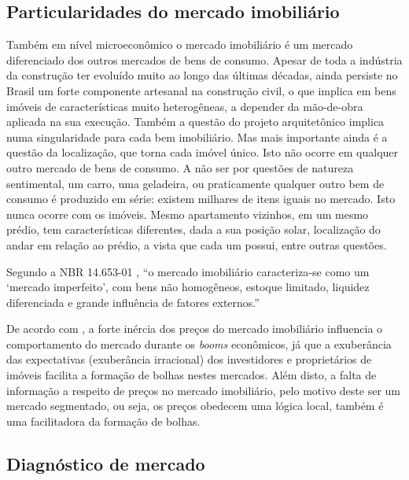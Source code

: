 \documentclass[
	12pt,				%
	oneside,			%
	a4paper,			%
	chapter=TITLE,		%
	section=TITLE,		%
	english,			%
	brazil				%
	]{abntex2}
\begin{document}
\hypertarget{particularidades-do-mercado-imobiliuxe1rio}{%
\subsection{Particularidades do mercado imobiliário}\label{particularidades-do-mercado-imobiliuxe1rio}}

Também em nível microeconômico o mercado imobiliário é um mercado diferenciado
dos outros mercados de bens de consumo. Apesar de toda a indústria da construção
ter evoluído muito ao longo das últimas décadas, ainda persiste no Brasil um
forte componente artesanal na construção civil, o que implica em bens imóveis
de características muito heterogêneas, a depender da mão-de-obra aplicada na sua
execução. Também a questão do projeto arquitetônico implica numa singularidade
para cada bem imobiliário. Mas mais importante ainda é a questão da localização,
que torna cada imóvel único. Isto não ocorre em qualquer outro mercado de bens
de consumo. A não ser por questões de natureza sentimental, um carro, uma
geladeira, ou praticamente qualquer outro bem de consumo é produzido em série:
existem milhares de itens iguais no mercado. Isto nunca ocorre com os imóveis.
Mesmo apartamento vizinhos, em um mesmo prédio, tem características diferentes,
dada a sua posição solar, localização do andar em relação ao prédio, a vista
que cada um possui, entre outras questões.

Segundo a NBR 14.653-01 \autocite*[x]{NBR1465301}, ``o mercado imobiliário caracteriza-se
como um `mercado imperfeito', com bens não homogêneos, estoque limitado,
liquidez diferenciada e grande influência de fatores externos.''

De acordo com \textcite[p.~3]{ADAMS2010}, a forte inércia dos preços do mercado
imobiliário influencia o comportamento do mercado durante os \emph{booms} econômicos,
já que a exuberância das expectativas (exuberância irracional) dos investidores
e proprietários de imóveis facilita a formação de bolhas nestes mercados. Além
disto, a falta de informação a respeito de preços no mercado imobiliário, pelo
motivo deste ser um mercado segmentado, ou seja, os preços obedecem uma lógica
local, também é uma facilitadora da formação de bolhas.

\hypertarget{diagnuxf3stico-de-mercado}{%
\subsection{Diagnóstico de mercado}\label{diagnuxf3stico-de-mercado}}
\end{document}
